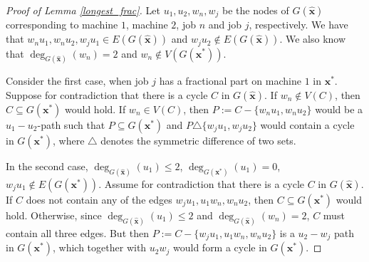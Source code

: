 \documentclass[a4paper,UKenglish,cleveref, autoref, thm-restate, pdfa]{lipics-v2021}
\theoremstyle{plain}
\begin{document}
\begin{proof}[Proof of Lemma \ref{longest_frac}]
    Let $u_1, u_2, w_n, w_j$ be the nodes of $G(\bm{\hat{x}})$ corresponding to machine $1$, machine $2$, job $n$ and job $j$, respectively. We have that $w_n u_1, w_n u_2, w_j u_1 \in E(G(\bm{\hat{x}}))$ and $w_j u_2 \not \in E(G(\bm{\hat{x}}))$. We also know that $\deg _{G(\bm{\hat{x}})} (w_n) = 2$ and $w_n \not \in V(G(\bm{x}^*))$.

    Consider the first case, when job $j$ has a fractional part on machine $1$ in $\bm{x}^*$. Suppose for contradiction that there is a cycle $C$ in $G(\bm{\hat{x}})$. If $w_n \not \in V(C)$, then $C \subseteq G(\bm{x}^*)$ would hold. If $w_n \in V(C)$, then $P:=C-\{w_n u_1,w_nu_2\}$ would be a $u_1 -u_2$-path such that $P\subseteq G(\bm{x}^*)$ and $P \triangle \{w_j u_1, w_j u_2\}$ would contain a cycle in $G(\bm{x}^*)$, where $\triangle$ denotes the symmetric difference of two sets.

    In the second case, $\deg_{G(\bm{\hat{x}})} (u_1) \le 2$, $\deg_{G(\bm{x}^*)}(u_1) = 0$, $w_j u_1 \not \in E(G(\bm{x}^*))$. Assume for contradiction that there is a cycle $C$ in $G(\bm{\hat{x}})$. If $C$ does not contain any of the edges $w_j u_1, u_1 w_n, w_n u_2$, then $C \subseteq G(\bm{x}^*)$ would hold. Otherwise, since $\deg_{G(\bm{\hat{x}})} (u_1) \le 2$ and $\deg_{G(\bm{\hat{x}})} (w_n)= 2$, $C$ must contain all three edges. But then $P:= C - \{w_j u_1, u_1 w_n, w_n u_2\}$ is a $u_2 - w_j$ path in $G(\bm{x}^*)$, which together with $u_2 w_j$ would form a cycle in $G(\bm{x}^*)$.
\end{proof}
\end{document}

